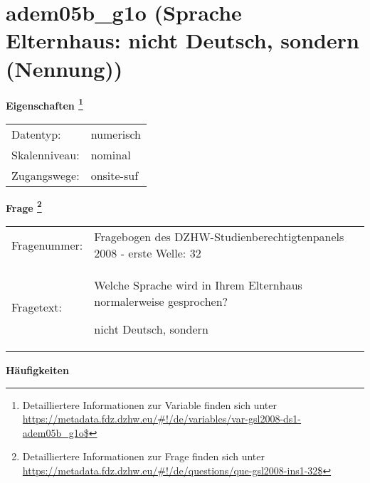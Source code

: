 
    \setcounter{footnote}{0}

    \vspace*{-1.8cm}
	\section{adem05b\_g1o (Sprache Elternhaus: nicht Deutsch, sondern (Nennung))}
	\label{section:adem05b_g1o}



    \vspace*{0.5cm}
    \noindent\textbf{Eigenschaften
	\footnote{Detailliertere Informationen zur Variable finden sich unter
		\url{https://metadata.fdz.dzhw.eu/\#!/de/variables/var-gsl2008-ds1-adem05b_g1o$}}}\\
	\begin{tabularx}{\hsize}{@{}lX}
	Datentyp: & numerisch \\
	Skalenniveau: & nominal \\
	Zugangswege: &
	  onsite-suf
 \\
    \end{tabularx}



				\vspace*{0.5cm}
                \noindent\textbf{Frage
	                \footnote{Detailliertere Informationen zur Frage finden sich unter
		              \url{https://metadata.fdz.dzhw.eu/\#!/de/questions/que-gsl2008-ins1-32$}}}\\
				\begin{tabularx}{\hsize}{@{}lX}
					Fragenummer: &
					  Fragebogen des DZHW-Studienberechtigtenpanels 2008 - erste Welle:
					  32
 \\
					Fragetext: & Welche Sprache wird in Ihrem Elternhaus normalerweise gesprochen?\par  nicht Deutsch, sondern \\
				\end{tabularx}





        		\vspace*{0.5cm}
                \noindent\textbf{Häufigkeiten}

